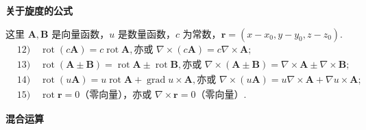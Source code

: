 \documentclass[UTF8, 12pt, fontset=fandol, oneside]{ctexart}
\begin{document}
\noindent\textbf{关于旋度的公式}

这里 $\mathbf A,\mathbf B$ 是向量函数，$u$ 是数量函数，$c$ 为常数，$\mathbf r=(x-x_0,y-y_0,z-z_0)$.
\[
\begin{aligned}
&12)\quad \operatorname{rot}(c\mathbf A)=c\operatorname{rot}\mathbf A,\text{亦或 }\nabla\times(c\mathbf A)=c\nabla\times\mathbf A;\\
&13)\quad \operatorname{rot}(\mathbf A\pm\mathbf B)=\operatorname{rot}\mathbf A\pm\operatorname{rot}\mathbf B,\text{亦或 }\nabla\times(\mathbf A\pm\mathbf B)=\nabla\times\mathbf A\pm\nabla\times\mathbf B;\\
&14)\quad \operatorname{rot}(u\mathbf A)=u\operatorname{rot}\mathbf A+\operatorname{grad}u\times\mathbf A,\text{亦或 }\nabla\times(u\mathbf A)=u\nabla\times\mathbf A+\nabla u\times\mathbf A;\\
&15)\quad \operatorname{rot}\mathbf r=0\text{（零向量），亦或 }\nabla\times\mathbf r=0\text{（零向量）}.
\end{aligned}
\]

\noindent\textbf{混合运算}
\end{document}

